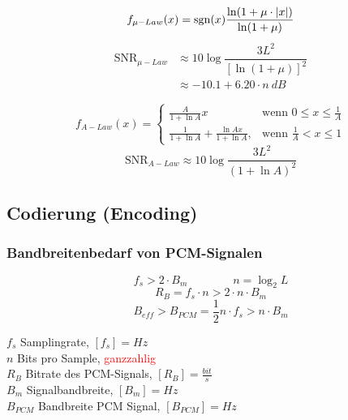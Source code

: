 \begin{minipage}{9cm}
$$ f_{\mu-Law}(x) = \operatorname{sgn}(x) \frac{\ln(1+\mu\cdot|x|)}{\ln(1+\mu)}$$
\begin{align*}\text{SNR}_{\mu-Law} &\approx 10 \log \dfrac{3 L^2}{[\ln(1 + \mu)]^2} \\
	&\approx -10.1 + 6.20 \cdot n \: dB \end{align*}
\end{minipage}
\begin{minipage}{9cm}
$$f_{A-Law}(x)=\begin{cases} \frac{A}{1+ \ln A} x & \mbox{wenn }0 \le x \le \frac{1}{A} \\
	\frac{1}{1+ \ln A} + \frac{\ln Ax}{1+ \ln A}, & \mbox{wenn } \frac{1}{A} < x \le 1 \end{cases} $$
$$\text{SNR}_{A-Law} \approx 10 \log \dfrac{3 L^2}{(1+\ln A)^2}$$
\end{minipage}

\subsection{Codierung (Encoding)}

\subsubsection{Bandbreitenbedarf von PCM-Signalen}
\begin{minipage}{9cm}
	$$ f_s > 2 \cdot B_m  \qquad \qquad n = \log_2 L$$ 
	$$ R_B = f_s \cdot n > 2 \cdot n \cdot B_m $$ 
	$$ B_{eff} > B_{PCM} = \frac{1}{2} n \cdot f_s > n \cdot B_m$$
\end{minipage}
\begin{minipage}{9cm}
	$f_s$ Samplingrate, $[f_s] = Hz$ \\
	$n$ Bits pro Sample, \textcolor{red}{ganzzahlig} \\
	$R_B$ Bitrate des PCM-Signals, $[R_B] = \frac{bit}{s}$ \\
	$B_m$ Signalbandbreite, $[B_m] = Hz $ \\
	$B_{PCM}$ Bandbreite PCM Signal, $[B_{PCM}] = Hz $
\end{minipage}


